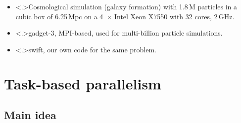\documentclass{beamer}
\begin{document}
    \begin{frame}
        \begin{itemize}
        
            \pause
        
            \item<+-> \alert<.>{Cosmological simulation} (galaxy formation) with
                \alert<+>{1.8\,M particles}
                in a cubic box of 6.25\,Mpc on a 4~$\times$ Intel Xeon X7550 with
                \alert<+>{32 cores}, 2\,GHz.
                
            \item<+-> \alert<.>{{\sc gadget}-3}, MPI-based,
               used for multi-billion particle simulations. 
                
            \item<+-> \alert<.>{\sc swift}, our own code for the same problem.
                
        \end{itemize}
        
        \vspace{1ex}
        
        
    \end{frame}
    
    
    \section{Task-based parallelism}
    \subsection{Main idea}
    
\end{document}
